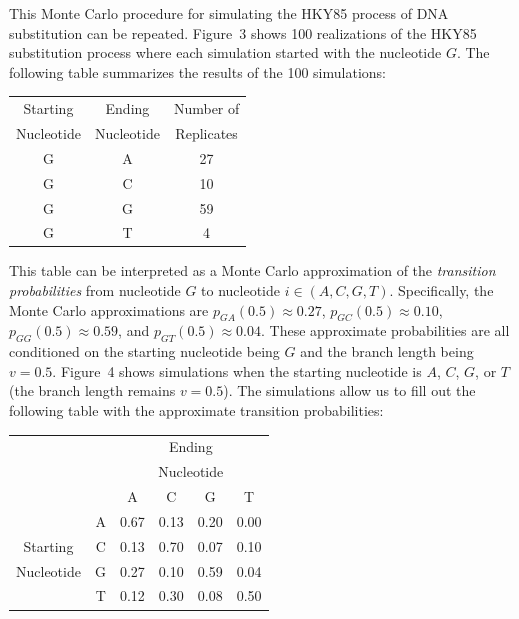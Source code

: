 \documentclass{svmult}
\begin{document}
This Monte Carlo procedure for simulating the HKY85 process of DNA substitution can be repeated.
Figure~3 shows 100 realizations of the HKY85 substitution process where each simulation started
with the nucleotide $G$.  The following table summarizes the results of the 100 simulations:
\begin{center}
\begin{tabular}{ccc}
Starting & Ending & Number of \\
Nucleotide & Nucleotide &  Replicates \\ \hline
G & A & 27 \\
G & C & 10 \\
G & G & 59 \\
G & T & 4 \\
\end{tabular}
\end{center}

This table can be interpreted as a Monte Carlo approximation of the {\it transition probabilities}
from nucleotide $G$ to nucleotide $i \in (A,C,G,T)$. Specifically, the Monte Carlo approximations
are 
$p_{GA}(0.5) \approx 0.27$, 
$p_{GC}(0.5) \approx 0.10$, 
$p_{GG}(0.5) \approx 0.59$, and
$p_{GT}(0.5) \approx 0.04$.
These approximate probabilities are all conditioned on the starting nucleotide being $G$ and the
branch length being $v = 0.5$. Figure~4 shows simulations when the starting nucleotide is $A$, $C$,
$G$, or $T$ (the branch length remains $v=0.5$). The simulations allow us to fill out the following
table with the approximate transition probabilities:
\begin{center}
\begin{tabular}{crcccc}
&    & \multicolumn{4}{c}{Ending} \\
&    & \multicolumn{4}{c}{Nucleotide} \\
                     &    & A  & C & G & T \\ \cline{2-6}
                     & A \vline & 0.67 & 0.13 & 0.20 & 0.00 \\
Starting       & C \vline & 0.13 & 0.70 & 0.07 & 0.10 \\
Nucleotide & G \vline & 0.27 & 0.10 & 0.59 & 0.04 \\
                     & T \vline & 0.12 & 0.30 & 0.08 & 0.50 \\ \cline{2-6}
\end{tabular}
\end{center}
\end{document}

